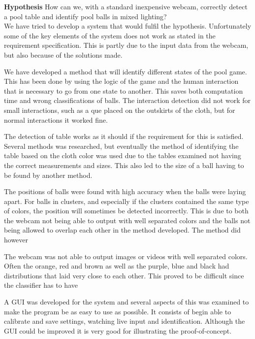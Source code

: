 \textbf{Hypothesis}
How can we, with a standard inexpensive webcam, correctly detect a pool table and identify pool balls in mixed lighting?\\

We have tried to develop a system that would fulfil the hypothesis. Unfortunately some of the key elements of the system does not work as stated in the requirement specification. This is partly due to the input data from the webcam, but also because of the solutions made.

We have developed a method that will identify different states of the pool game. This has been done by using the logic of the game and the human interaction that is necessary to go from one state to another. This saves both computation time and wrong classifications of balls. The interaction detection did not work for small interactions, such as a que placed on the outskirts of the cloth, but for normal interactions it worked fine.

The detection of table works as it should if the requirement for this is satisfied. Several methods was researched, but eventually the method of identifying the table based on the cloth color was used due to the tables examined not having the correct measurements and sizes. This also led to the size of a ball having to be found by another method.

The positions of balls were found with high accuracy when the balls were laying apart. For balls in clusters, and especially if the clusters contained the same type of colors, the position will sometimes be detected incorrectly. This is due to both the webcam not being able to output with well separated colors and the balls not being allowed to overlap each other in the method developed. The method did however 



The webcam was not able to output images or videos with well separated colors. Often the orange, red and brown as well as the purple, blue and black had distributions that laid very close to each other. This proved to be difficult since the classifier has to have 

A GUI was developed for the system and several aspects of this was examined to make the program be as easy to use as possible. It consists of begin able to calibrate and save settings, watching live input and identification. Although the GUI could be improved it is very good for illustrating the proof-of-concept.


